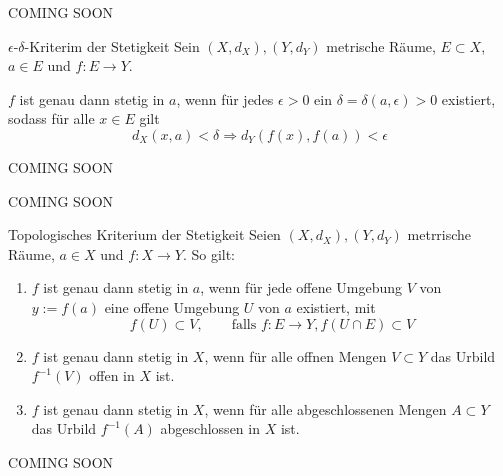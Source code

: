 \begin{bemerkungbox}
    COMING SOON
\end{bemerkungbox}

\begin{satz}{$\epsilon$-$\delta$-Kriterim der Stetigkeit}
    Sein $(X,d_X), (Y,d_Y)$ metrische Räume, $E \subset X$, $a\in E$ und $f:E \to Y$.
    \vspace{1em}

    $f$ ist genau dann stetig in $a$, wenn für jedes $\epsilon >0$ ein $\delta = \delta (a,\epsilon) >0$ existiert, sodass für alle $x \in E$ gilt
    $$
        d_X(x,a) < \delta \Rightarrow d_Y(f(x),f(a))<\epsilon
    $$
\end{satz}

\begin{bemerkungbox}
    COMING SOON
\end{bemerkungbox}

\begin{beweisbox}
    COMING SOON
\end{beweisbox}

\begin{satz}{Topologisches Kriterium der Stetigkeit}
    Seien $(X,d_X), (Y,d_Y)$ metrrische Räume, $a\in X$ und $f:X \to Y$. So gilt:
    \begin{enumerate}
        \item $f$ ist genau dann stetig in $a$, wenn für jede offene Umgebung $V$ von $y:=f(a)$ eine offene Umgebung $U$ von $a$ existiert, mit
        $$
            f(U) \subset V, \qquad \text{falls } f:E \to Y, f(U\cap E) \subset V
        $$

        \item $f$ ist genau dann stetig in $X$, wenn für alle offnen Mengen $V \subset Y$ das Urbild $f^{-1}(V)$ offen in $X$ ist.

        \item $f$ ist genau dann stetig in $X$, wenn für alle abgeschlossenen Mengen $A\subset Y$ das Urbild $f^{-1}(A)$ abgeschlossen in $X$ ist. 
    \end{enumerate}
\end{satz}

\begin{beweisbox}
    COMING SOON
\end{beweisbox}

